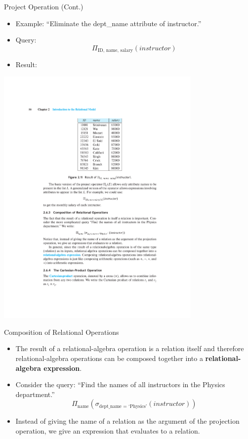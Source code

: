 \documentclass{beamer}
\begin{document}
\begin{frame}{Project Operation (Cont.)}
    \begin{itemize}
        \item Example: ``Eliminate the dept\_name attribute of instructor.''
        \item Query: $$
            \Pi_{\text{ID, name, salary}}(instructor)
        $$
        \item Result: 
    \end{itemize}
    \centering
    \includegraphics[width=0.75\textwidth, trim={5.50cm 17.00cm 5.00cm 4.75cm}, clip]{figures/db_project}
\end{frame}

\begin{frame}{Composition of Relational Operations}
    \begin{itemize}
        \item The result of a relational-algebra operation is a relation itself and therefore relational-algebra operations can be composed together into a \textbf{relational-algebra expression}.
        \item Consider the query: ``Find the names of all instructors in the Physics department.''
        {\Large
        $$
            \Pi_{\text{name}}(\sigma_{\text{dept\_name } = \text{ `Physics'}} (instructor))
        $$}
        \item Instead of giving the name of a relation as the argument of the projection operation, we give an expression that evaluates to a relation.
    \end{itemize}
\end{frame}
\end{document}
